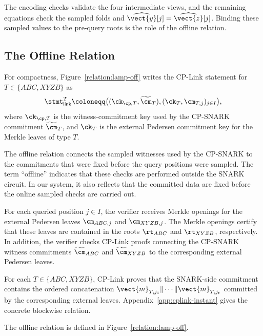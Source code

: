 The encoding checks validate the four intermediate views, and the remaining
equations check the sampled folds and \(\widehat{\vect{y}}[j]=
\widehat{\vect{z}}[j]\).  Binding these sampled values to the pre-query roots
is the role of the offline relation.

\subsection{The Offline Relation}
\label{sec:openings-and-cplink}

For compactness, Figure~\ref{relation:lamp-off} writes the CP-Link statement
for \(T\in\{ABC,XYZB\}\) as
\[
  \stmt_{\mathsf{link}}^T
  \coloneqq
  \big(
    (\ck_{\cp,T},\widetilde{\cm}_{T}),
    (\ck_T,\cm_{T,j})_{j\in I}
  \big),
\]
where \(\ck_{\cp,T}\) is the witness-commitment key used by the CP-SNARK
commitment \(\widetilde{\cm}_{T}\), and \(\ck_T\) is the external Pedersen
commitment key for the Merkle leaves of type \(T\).

The offline relation connects the sampled witnesses used by the
CP-SNARK to the commitments that were fixed before the query positions were
sampled.  The term ``offline'' indicates that these checks are performed outside the SNARK circuit. In our system, it also reflects that the committed data are fixed before the online sampled checks are carried out.

For each queried position \(j\in I\), the verifier receives Merkle openings for the external Pedersen leaves $\cm_{ABC,j}$ and $\cm_{XYZB,j}$.
The Merkle openings certify that these leaves are contained in the roots
\(\rt_{ABC}\) and \(\rt_{XYZB}\), respectively.  In addition, the verifier checks
CP-Link proofs connecting the CP-SNARK witness commitments
\(\widetilde{\cm}_{ABC}\) and \(\widetilde{\cm}_{XYZB}\) to the corresponding
external Pedersen leaves.

For each \(T\in\{ABC,XYZB\}\), CP-Link proves that the SNARK-side commitment
contains the ordered concatenation
\(\vect{m}_{T,j_1}\|\cdots\|\vect{m}_{T,j_t}\) committed by the corresponding
external leaves.  Appendix~\ref{app:cplink-instant} gives the concrete
blockwise relation.


The offline relation is defined in Figure~\ref{relation:lamp-off}.

